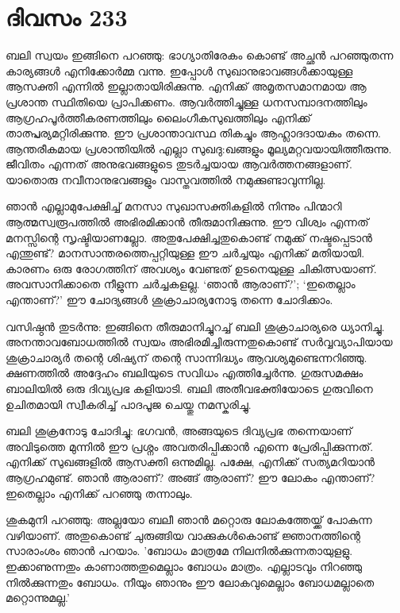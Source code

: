 \section{ദിവസം 233}


ബലി സ്വയം ഇങ്ങിനെ പറഞ്ഞു: ഭാഗ്യാതിരേകം കൊണ്ട് അച്ഛന്‍ പറഞ്ഞുതന്ന കാര്യങ്ങള്‍ എനിക്കോര്‍മ്മ വന്നു. ഇപ്പോള്‍ സുഖാനുഭാവങ്ങള്‍ക്കായുള്ള ആസക്തി എന്നില്‍ ഇല്ലാതായിരിക്കുന്നു. എനിക്ക് അമൃതസമാനമായ ആ  പ്രശാന്ത സ്ഥിതിയെ പ്രാപിക്കണം. ആവര്‍ത്തിച്ചുള്ള ധനസമ്പാദനത്തിലും ആഗ്രഹപൂര്‍ത്തീകരണത്തിലും ലൈംഗീകസുഖത്തിലും  എനിക്ക് താത്പ്പര്യമറ്റിരിക്കുന്നു. ഈ പ്രശാന്താവസ്ഥ തികച്ചും ആഹ്ലാദദായകം തന്നെ. ആന്തരീകമായ പ്രശാന്തിയില്‍ എല്ലാ സുഖദു:ഖങ്ങളും മൂല്യമറ്റവയായിത്തീരുന്നു. ജീവിതം എന്നത് അനുഭവങ്ങളുടെ തുടര്‍ച്ചയായ ആവര്‍ത്തനങ്ങളാണ്. യാതൊരു നവീനാനുഭവങ്ങളും വാസ്തവത്തില്‍ നമുക്കുണ്ടാവുന്നില്ല.

ഞാന്‍ എല്ലാമുപേക്ഷിച്ച് മനസാ സുഖാസക്തികളില്‍ നിന്നും പിന്മാറി ആത്മസ്വരൂപത്തില്‍ അഭിരമിക്കാന്‍ തീരുമാനിക്കുന്നു. ഈ വിശ്വം എന്നത് മനസ്സിന്റെ സൃഷ്ടിയാണല്ലോ. അതുപേക്ഷിച്ചതുകൊണ്ട് നമുക്ക് നഷ്ടപ്പെടാന്‍ എന്തുണ്ട്? മാനസാന്തരത്തെപ്പറ്റിയുള്ള ഈ ചര്‍ച്ചയും എനിക്ക് മതിയായി. കാരണം ഒരു രോഗത്തിന് അവശ്യം വേണ്ടത് ഉടനെയുള്ള ചികിത്സയാണ്. അവസാനിക്കാതെ നീളുന്ന ചര്‍ച്ചകളല്ല. ‘ഞാന്‍ ആരാണ്?’; ‘ഇതെല്ലാം എന്താണ്?’ ഈ ചോദ്യങ്ങള്‍ ശുക്രാചാര്യനോടു തന്നെ ചോദിക്കാം. 

വസിഷ്ഠന്‍ തുടര്‍ന്നു: ഇങ്ങിനെ തീരുമാനിച്ചുറച്ച് ബലി ശുക്രാചാര്യരെ ധ്യാനിച്ചു. അനന്താവബോധത്തില്‍ സ്വയം അഭിരമിച്ചിരുന്നതുകൊണ്ട് സര്‍വ്വവ്യാപിയായ ശുക്രാചാര്യര്‍ തന്റെ ശിഷ്യന് തന്റെ സാന്നിദ്ധ്യം ആവശ്യമുണ്ടെന്നറിഞ്ഞു. ക്ഷണത്തില്‍ അദ്ദേഹം ബലിയുടെ സവിധം എത്തിച്ചേര്‍ന്നു. ഗുരുസമക്ഷം ബാലിയില്‍ ഒരു ദിവ്യപ്രഭ കളിയാടി. ബലി അതീവഭക്തിയോടെ ഗുരുവിനെ ഉചിതമായി സ്വീകരിച്ച് പാദപൂജ ചെയ്തു നമസ്കരിച്ചു.

ബലി ശുക്രനോടു ചോദിച്ചു: ഭഗവന്‍, അങ്ങയുടെ ദിവ്യപ്രഭ തന്നെയാണ് അവിടുത്തെ മുന്നില്‍ ഈ പ്രശ്നം അവതരിപ്പിക്കാന്‍ എന്നെ പ്രേരിപ്പിക്കുന്നത്. എനിക്ക് സുഖങ്ങളില്‍ ആസക്തി ഒന്നുമില്ല. പക്ഷേ, എനിക്ക് സത്യമറിയാന്‍ ആഗ്രഹമുണ്ട്. ഞാന്‍ ആരാണ്? അങ്ങ് ആരാണ്? ഈ ലോകം എന്താണ്? ഇതെല്ലാം എനിക്ക് പറഞ്ഞു തന്നാലും. 

ശുകമുനി പറഞ്ഞു: അല്ലയോ ബലീ ഞാന്‍ മറ്റൊരു ലോകത്തേയ്ക്ക് പോകുന്ന വഴിയാണ്. അതുകൊണ്ട് ചുരുങ്ങിയ വാക്കുകള്‍കൊണ്ട് ജ്ഞാനത്തിന്റെ സാരാംശം ഞാന്‍ പറയാം. 'ബോധം മാത്രമേ നിലനില്‍ക്കുന്നതായുളളു. ഇക്കാണുന്നതും കാണാത്തതുമെല്ലാം ബോധം മാത്രം. എല്ലാടവും നിറഞ്ഞു നില്‍ക്കുന്നതും ബോധം. നീയും ഞാനും ഈ ലോകവുമെല്ലാം ബോധമല്ലാതെ മറ്റൊന്നുമല്ല.'   

